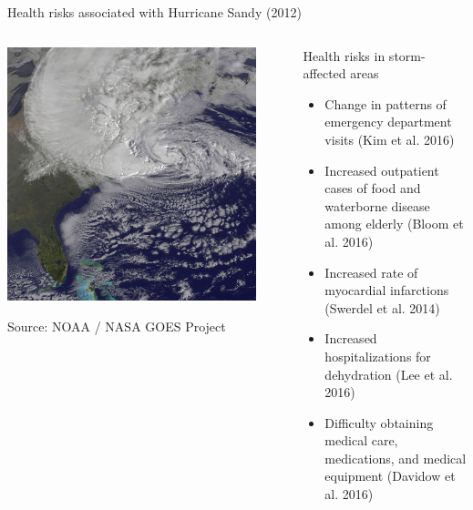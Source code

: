 \documentclass[ignorenonframetext,]{beamer}
\begin{document}
\begin{frame}{Health risks associated with Hurricane Sandy (2012)}

\begin{columns}

\begin{column}{0.4\textwidth}

\begin{center}\includegraphics[width=0.9\textwidth]{sandy_satellite} \end{center}
\vspace{-0.5cm}
\begin{center}
\scriptsize Source: NOAA / NASA GOES Project
\end{center}
\end{column}

\begin{column}{0.6\textwidth}
\begin{block}{Health risks in storm-affected areas}
\small
\begin{itemize}
  \item Change in patterns of emergency department visits (Kim et al. 2016)
  \item Increased outpatient cases of food and waterborne disease among elderly (Bloom et al. 2016)
  \item Increased rate of myocardial infarctions (Swerdel et al. 2014)
  \item Increased hospitalizations for dehydration (Lee et al. 2016)
  \item Difficulty obtaining medical care, medications, and medical equipment (Davidow et al. 2016)
\end{itemize}
\end{block}
\end{column}

\end{columns}

\end{frame}
\end{document}
